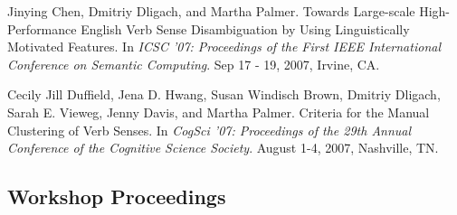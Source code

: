 \documentclass[letterpaper]{article}
\renewenvironment{itemize}{
  \begin{list}{}{
    \setlength{\leftmargin}{1.5em}
  }
}{
  \end{list}
}
\begin{document}
\begin{itemize}
\item Jinying Chen, Dmitriy Dligach, and Martha Palmer. Towards Large-scale High-Performance English Verb Sense Disambiguation by Using Linguistically Motivated Features. In \emph {ICSC '07: Proceedings of the First IEEE International Conference on Semantic Computing}. Sep 17 - 19, 2007, Irvine, CA.
\item Cecily Jill Duffield, Jena D. Hwang, Susan Windisch Brown, Dmitriy Dligach, Sarah E. Vieweg, Jenny Davis, and Martha Palmer. Criteria for the Manual Clustering of Verb Senses. In \emph {CogSci '07: Proceedings of the 29th Annual Conference of the Cognitive Science Society}. August 1-4, 2007, Nashville, TN.
\end{itemize}

\subsection*{Workshop Proceedings}
\end{document}
